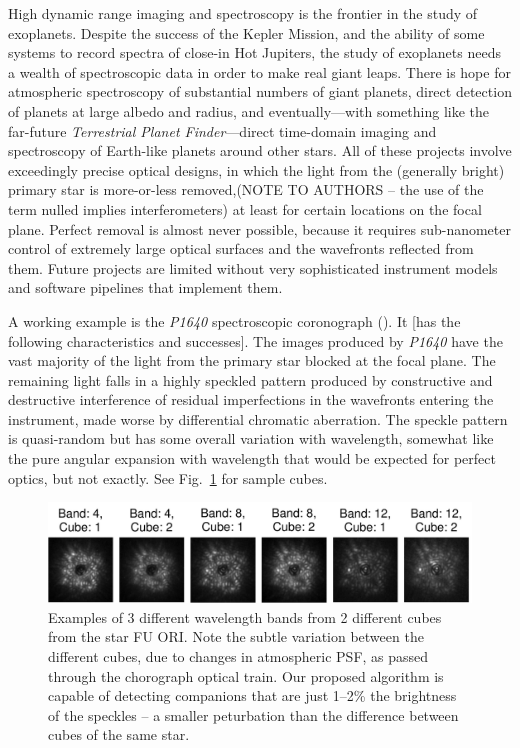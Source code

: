 \documentclass[12pt,pdftex,preprint]{aastex}
\newcommand{\project}[1]{\textsl{#1}}
\newcommand{\fig}[1]{Fig.\ \ref{fig:#1}}
\begin{document}
High dynamic range imaging and spectroscopy is the frontier in
the study of exoplanets. Despite the success of the Kepler Mission,
and the ability of some systems to record spectra of close-in Hot
Jupiters, the study of exoplanets needs a wealth of spectroscopic data
in order to make real giant leaps.  There is hope for atmospheric
spectroscopy
of substantial numbers of giant planets, direct detection of planets
at large albedo and radius, and eventually---with something like the
far-future \project{Terrestrial Planet Finder}---direct time-domain
imaging and spectroscopy of Earth-like planets around other stars.
All of these projects involve exceedingly precise optical designs, in
which the light from the (generally bright) primary star is
more-or-less removed,(NOTE TO AUTHORS – the use of the term nulled
implies interferometers)  at least for certain locations on the focal
plane.  Perfect removal is almost never possible, because it requires
sub-nanometer control of extremely large optical surfaces and the
wavefronts reflected from them.  Future projects are limited
without very sophisticated instrument models and software pipelines
that implement them.

A working example is the \project{P1640} spectroscopic coronograph
(\citealt{p1640}).  It [has the following characteristics and
 successes].  The images produced by \project{P1640} have the vast
majority of the light from the primary star blocked at the focal plane.
The remaining light falls in a highly speckled pattern produced by
constructive and destructive interference of residual imperfections in
the wavefronts entering the instrument, made worse by differential
chromatic aberration.  The speckle pattern is quasi-random but has
some overall variation with wavelength, somewhat like the pure angular
expansion with wavelength that would be expected for perfect optics,
but not exactly. See \fig{examples} for sample cubes.


\begin{figure}[h!]
\begin{center}
\includegraphics[width=6in]{figs/examples.pdf}
\end{center}
\vspace{-7mm}
\caption{Examples of 3 different wavelength bands from 2 different
 cubes from the star FU ORI. Note the subtle variation between the
 different cubes, due to changes in atmospheric PSF, as passed
 through the chorograph optical train. Our proposed algorithm is
 capable of detecting companions that are just 1--2\% the brightness
 of the speckles -- a smaller peturbation than the difference between
 cubes of the same star.}
\label{fig:examples}
\end{figure}
\end{document}
